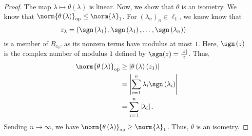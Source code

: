 \documentclass[10pt]{mypackage}
\begin{document}
\begin{proof}
  The map $\lambda \mapsto \theta\left(\lambda\right)$ is linear. Now, we show that $\theta$ is an isometry. We know that $\norm{\theta\left(\lambda\right)}_{\text{op}}\leq \norm{\lambda}_{1}$. For $\left(\lambda_n\right)_n\in \ell_1$, we know know that
  \begin{align*}
    z_{\lambda} &= \left(\sgn\left(\lambda_1\right),\sgn\left(\lambda_1\right),\dots,\sgn\left(\lambda_n\right)\right)
  \end{align*}
  is a member of $B_{c_0}$, as its nonzero terms have modulus at most $1$. Here, $\sgn\left(z\right)$ is the complex number of modulus $1$ defined by $\sgn(z) = \frac{|z|}{z}$. Thus,
  \begin{align*}
    \norm{\theta\left(\lambda\right)}_{\text{op}} &\geq \left\vert \theta\left(\lambda\right)\left(z_1\right) \right\vert\\
                                                  &= \left\vert \sum_{i=1}^{n}\lambda_i\sgn\left(\lambda_i\right) \right\vert\\
                                                  &= \sum_{i=1}^{n}\left\vert \lambda_i \right\vert.
  \end{align*}
  Sending $n\rightarrow\infty$, we have $\norm{\theta\left(\lambda\right)}_{\text{op}} \geq \norm{\lambda}_1$. Thus, $\theta$ is an isometry.\newline


\end{proof}
\end{document}
